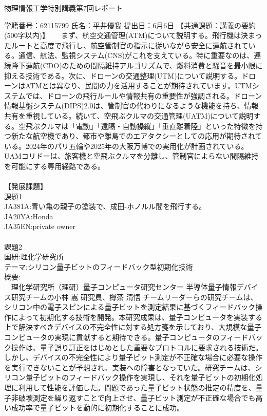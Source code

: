 \documentclass[a4paper,10.5pt]{ltjsarticle}
\begin{document}
\centerline
{\huge 物理情報工学特別講義第7回レポート}
\rightline
{学籍番号：62115799}
\rightline
{氏名：平井優我}
\rightline
{提出日：6月6日}
\rightline
{}
\leftline
{\large 【共通課題：講義の要約(500字以内)】}
　 まず、航空交通管理(ATM)について説明する。飛行機は決まったルートと高度で飛行し、航空管制官の指示に従いながら安全に運航されている。通信、航法、監視システム(CNS)がこれを支えている。特に重要なのは、連続降下運航(CDO)のための間隔維持アルゴリズムで、燃料消費と騒音を最小限に抑える技術である。次に、ドローンの交通整理(UTM)について説明する。ドローンはATMとは異なり、民間の力を活用することが期待されています。UTMシステムでは、ドローンの飛行ルールや情報共有の重要性が強調される。ドローン情報基盤システム(DIPS)2.0は、管制官の代わりになるような機能を持ち、情報共有を重視している。続いて、空飛ぶクルマの交通管理(UATM)について説明する。空飛ぶクルマは「電動」「遠隔・自動操縦」「垂直離着陸」といった特徴を持つ新たな航空機であり、都市や離島でのエアタクシーとしての応用が期待されている。2024年のパリ五輪や2025年の大阪万博での実用化が計画されている。UAMコリドーは、旅客機と空飛ぶクルマを分離し、管制官によらない間隔維持を可能にする専用経路である。\\
\\
\leftline
{\large 【発展課題】}\\
課題1\\
JA381A:青い亀の親子の塗装で、成田-ホノルル間を飛行する。\\
JA20YA:Honda\\
JA35EN:private owner\\
\\
課題2\\
国研:理化学研究所\\
テーマ:シリコン量子ビットのフィードバック型初期化技術\\
概要:\\
　理化学研究所（理研）量子コンピュータ研究センター 半導体量子情報デバイス研究チームの小林 嵩 研究員、樽茶 清悟 チームリーダーらの研究チームは、シリコン中の電子スピンによる量子ビットを測定結果に基づくフィードバック操作によって初期化する技術を開発。本研究成果は、量子コンピュータを実装する上で解決すべきデバイスの不完全性に対する処方箋を示しており、大規模な量子コンピュータの実現に貢献すると期待できる。量子コンピュータのフィードバック操作は、量子誤り訂正をはじめとした重要なプロトコルに要求される技術だ。しかし、デバイスの不完全性により量子ビット測定が不正確な場合に必要な操作を実行できないことが予想され、実装への障害となっていた。研究チームは、シリコン量子ビットのフィードバック操作を実現し、それを量子ビットの初期化処理に利用して性能を評価した。問題であった量子ビット状態の推定の精度を、量子非破壊測定を繰り返すことで向上させ、量子ビット測定が不正確な場合でも高い成功率で量子ビットを動的に初期化することに成功。
\end{document}
